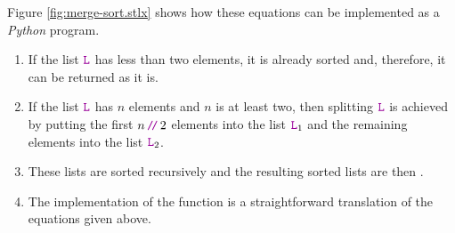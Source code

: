 Figure \ref{fig:merge-sort.stlx} shows how these equations can be implemented as a \textsl{Python}
program.  
\begin{enumerate}
\item If the list $\mytt{L}$ has less than two elements, it is already sorted and, therefore, it
      can be returned as it is.
\item If the list $\mytt{L}$ has $n$ elements and $n$ is at least two, then splitting $\mytt{L}$ is achieved by putting the
      first $n\dv 2$ 
      elements into the list $\mytt{L}_1$ and the remaining elements into the list $\mytt{L}_2$.
\item These lists are sorted recursively and the resulting sorted lists are then .
\item The implementation of the function  is a straightforward translation of the equations
      given above.
\end{enumerate}

